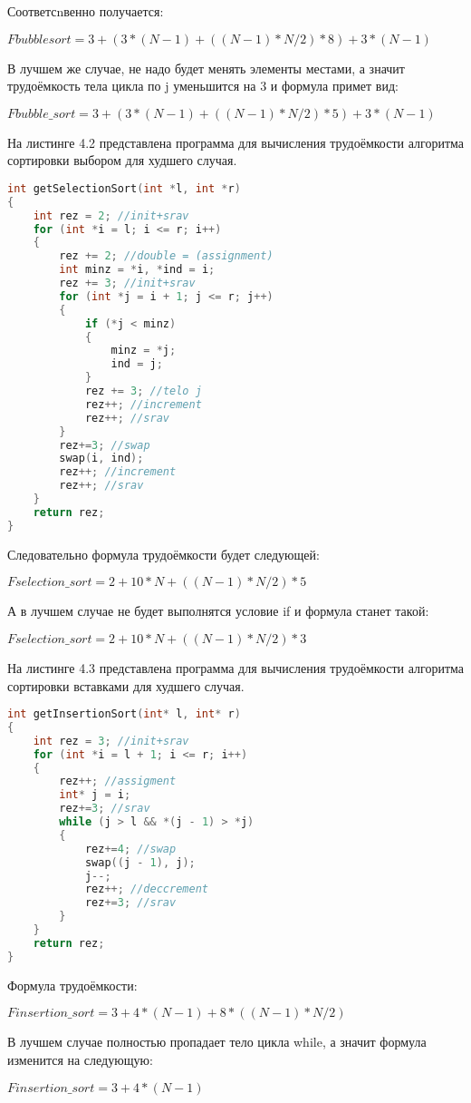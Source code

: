 Соответсnвенно получается:

$Fbubblesort = 3 + (3*(N-1) + ((N-1)*N/2)*8) + 3*(N-1)$

В лучшем же случае, не надо будет менять элементы местами, а значит трудоёмкость тела цикла по j уменьшится на 3 и формула примет вид:

$Fbubble\_sort = 3 + (3*(N-1) + ((N-1)*N/2)*5) + 3*(N-1)$

\newpage
На листинге 4.2 представлена программа для вычисления трудоёмкости алгоритма сортировки выбором для худшего случая.

\begin{lstlisting}[language=c++, caption=Вычисление трудоёмкости алгоритма сортировки выбором]
int getSelectionSort(int *l, int *r)
{
	int rez = 2; //init+srav
	for (int *i = l; i <= r; i++)
	{
		rez += 2; //double = (assignment)
		int minz = *i, *ind = i;
		rez += 3; //init+srav
		for (int *j = i + 1; j <= r; j++)
		{
			if (*j < minz)
			{
				minz = *j;
				ind = j;
			}
			rez += 3; //telo j
			rez++; //increment
			rez++; //srav
		}
		rez+=3; //swap
		swap(i, ind);
		rez++; //increment
		rez++; //srav
	}
	return rez;
}
\end{lstlisting}

Следовательно формула трудоёмкости будет следующей:

$Fselection\_sort = 2 + 10*N + ((N-1)*N/2)*5$

А в лучшем случае не будет выполнятся условие if и формула станет такой:

$Fselection\_sort = 2 + 10*N + ((N-1)*N/2)*3$

\newpage
На листинге 4.3 представлена программа для вычисления трудоёмкости алгоритма сортировки вставками для худшего случая.

\begin{lstlisting}[language=c++, caption=Вычисление трудоёмкости алгоритма сортировки вставками]
int getInsertionSort(int* l, int* r)
{
	int rez = 3; //init+srav
	for (int *i = l + 1; i <= r; i++)
	{
		rez++; //assigment
		int* j = i;
		rez+=3; //srav
		while (j > l && *(j - 1) > *j)
		{
			rez+=4; //swap
			swap((j - 1), j);
			j--;
			rez++; //deccrement
			rez+=3; //srav
		}
	}
	return rez;
}
\end{lstlisting}

Формула трудоёмкости:

$Finsertion\_sort = 3 + 4*(N-1) + 8*((N-1)*N/2)$

В лучшем случае полностью пропадает тело цикла while, а значит формула изменится на следующую:

$Finsertion\_sort = 3 + 4*(N-1)$